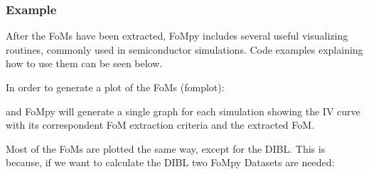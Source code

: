 \documentclass[letterpaper,10pt,english,openany, oneside]{sphinxmanual}
\begin{document}
\subsubsection*{Example}

After the FoMs have been extracted, FoMpy includes several useful visualizing routines,
commonly used in semiconductor simulations. Code examples explaining how to use them can be seen below.

In order to generate a plot of the FoMs (fomplot):

%
\begin{sphinxVerbatim}[commandchars=\\\{\}]
 
  
   
     
   
\end{sphinxVerbatim}

and FoMpy will generate a single graph for each simulation showing the IV curve with its correspondent FoM extraction criteria and the extracted FoM.

Most of the FoMs are plotted the same way, except for the DIBL. This is because, if we want to calculate the DIBL
two FoMpy Datasets are needed:
\end{document}
